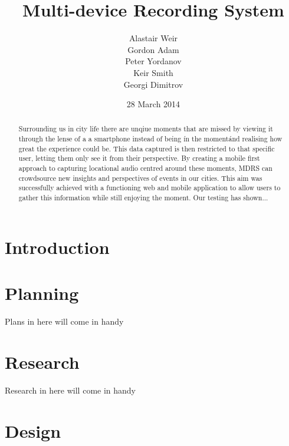 \documentclass{l3proj}
\begin{document}
\title{Multi-device Recording System}
\author{Alastair Weir \\
        Gordon Adam \\
        Peter Yordanov \\
        Keir Smith \\
        Georgi Dimitrov}
\date{28 March 2014}
\maketitle
\begin{abstract}

Surrounding us in city life there are unqiue moments that are missed by viewing it through the lense of a a smartphone instead of being \'in the moment\' and realising how great the experience could be. This data captured is then restricted to that specific user, letting them only see it from their perspective. By creating a mobile first approach to capturing locational audio centred around these moments, MDRS can crowdsource new insights and perspectives of events in our cities. This aim was successfully achieved with a functioning web and mobile application to allow users to gather this information while still enjoying the moment. Our testing has shown...

\end{abstract}
\educationalconsent
\tableofcontents
\chapter{Introduction}
\label{intro}

\chapter{Planning}
\label{Planning}

Plans in here will come in handy

\chapter{Research}
\label{Research}

Research in here will come in handy

\chapter{Design}
\label{design}
\end{document}
